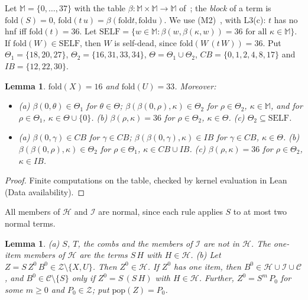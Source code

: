 \documentclass[11pt]{amsart}
\newtheorem{lemma}[theorem]{Lemma}
\theoremstyle{definition}
\newcommand{\fold}{\mathrm{fold}}
\newcommand{\pop}{\mathrm{pop}}
\newcommand{\Hc}{\mathcal H}
\newcommand{\Ic}{\mathcal I}
\newcommand{\Cc}{\mathcal C}
\newcommand{\Zc}{\mathcal Z}
\newcommand{\Self}{\mathrm{SELF}}
\begin{document}
Let $\mathbb M=\{0,\dots,37\}$ with the table $\beta\colon\mathbb M\times\mathbb M\to\mathbb M$
of~\citep{s1}; the \emph{block} of a term is $\fold(S)=0$, $\fold(t\,u)=\beta(\fold t,\fold u)$. We
use (M2)~\citep[Proposition~4 and Theorem~9]{s1}, with L3(c): $t$ has no hnf iff $\fold(t)=36$.
Let $\Self=\{w\in\mathbb M:\beta(w,\beta(\kappa,w))=36\text{ for all }\kappa\in\mathbb M\}$. If
$\fold(W)\in\Self$, then $W$ is self-dead, since $\fold(W\,(t\,W))=36$. Put $\Theta_1=\{18,20,27\}$,
$\Theta_2=\{16,31,33,34\}$, $\Theta=\Theta_1\cup\Theta_2$, $CB=\{0,1,2,4,8,17\}$ and
$IB=\{12,22,30\}$.

\begin{lemma}\label{lem:tables}
$\fold(X)=16$ and $\fold(U)=33$. Moreover:
\begin{itemize}
\item[T16] \textup{(a)} $\beta(0,\theta)\in\Theta_1$ for $\theta\in\Theta$;
  $\beta(\beta(0,\rho),\kappa)\in\Theta_2$ for $\rho\in\Theta_2$, $\kappa\in\mathbb M$, and for
  $\rho\in\Theta_1$, $\kappa\in\Theta\cup\{0\}$.
  \textup{(b)} $\beta(\rho,\kappa)=36$ for $\rho\in\Theta_2$, $\kappa\in\Theta$.
  \textup{(c)} $\Theta_2\subseteq\Self$.
\item[T17] \textup{(a)} $\beta(0,\gamma)\in CB$ for $\gamma\in CB$;
  $\beta(\beta(0,\gamma),\kappa)\in IB$ for $\gamma\in CB$, $\kappa\in\Theta$.
  \textup{(b)} $\beta(\beta(0,\rho),\kappa)\in\Theta_2$ for $\rho\in\Theta_1$, $\kappa\in CB\cup IB$.
  \textup{(c)} $\beta(\rho,\kappa)=36$ for $\rho\in\Theta_2$, $\kappa\in IB$.
\end{itemize}
\end{lemma}

\begin{proof}
Finite computations on the table, checked by kernel evaluation in Lean (Data availability).
\end{proof}

All members of $\Hc$ and $\Ic$ are normal, since each rule applies $S$ to at most two normal terms.

\begin{lemma}\label{lem:ch}
\textup{(a)} $S$, $T$, the combs and the members of $\Ic$ are not in $\Hc$. The one-item members
of $\Hc$ are the terms $S\,H$ with $H\in\Hc$.
\textup{(b)} Let $Z=S\,Z^0\,B^0\in\Zc\setminus\{X,U\}$. Then $Z^0\in\Hc$. If $Z^0$ has one item,
then $B^0\in\Hc\cup\Ic\cup\Cc$, and $B^0\in\Cc\setminus\{S\}$ only if $Z^0=S\,(S\,H)$ with
$H\in\Hc$. Further, $Z^0=S^m\,P_0$ for some $m\ge0$ and $P_0\in\Zc$; put $\pop(Z)=P_0$.
\end{lemma}
\end{document}

